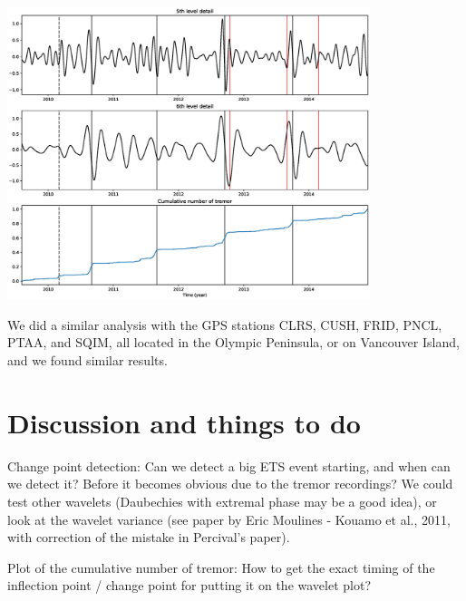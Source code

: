 \documentclass[main.tex]{subfiles}
\begin{document}
\begin{center}
\includegraphics[width=300pt]{Figures/slowslip_results/Figure_4.eps}
\captionsetup{type=figure}
\end{center}

We did a similar analysis with the GPS stations CLRS, CUSH, FRID, PNCL, PTAA, and SQIM, all located in the Olympic Peninsula, or on Vancouver Island, and we found similar results.

\chapter{Discussion and things to do}

Change point detection: Can we detect a big ETS event starting, and when can we detect it? Before it becomes obvious due to the tremor recordings? We could test other wavelets (Daubechies with extremal phase may be a good idea), or look at the wavelet variance (see paper by Eric Moulines - Kouamo et al., 2011, with correction of the mistake in Percival's paper).

Plot of the cumulative number of tremor: How to get the exact timing of the inflection point / change point for putting it on the wavelet plot?
\end{document}
